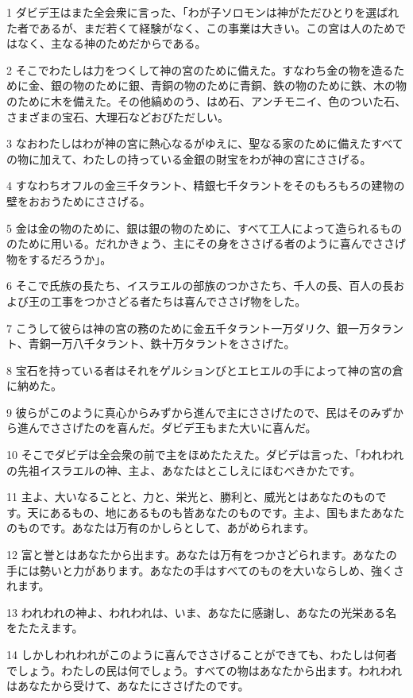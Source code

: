 \par 1 ダビデ王はまた全会衆に言った、「わが子ソロモンは神がただひとりを選ばれた者であるが、まだ若くて経験がなく、この事業は大きい。この宮は人のためではなく、主なる神のためだからである。
\par 2 そこでわたしは力をつくして神の宮のために備えた。すなわち金の物を造るために金、銀の物のために銀、青銅の物のために青銅、鉄の物のために鉄、木の物のために木を備えた。その他縞めのう、はめ石、アンチモニイ、色のついた石、さまざまの宝石、大理石などおびただしい。
\par 3 なおわたしはわが神の宮に熱心なるがゆえに、聖なる家のために備えたすべての物に加えて、わたしの持っている金銀の財宝をわが神の宮にささげる。
\par 4 すなわちオフルの金三千タラント、精銀七千タラントをそのもろもろの建物の壁をおおうためにささげる。
\par 5 金は金の物のために、銀は銀の物のために、すべて工人によって造られるもののために用いる。だれかきょう、主にその身をささげる者のように喜んでささげ物をするだろうか」。
\par 6 そこで氏族の長たち、イスラエルの部族のつかさたち、千人の長、百人の長および王の工事をつかさどる者たちは喜んでささげ物をした。
\par 7 こうして彼らは神の宮の務のために金五千タラント一万ダリク、銀一万タラント、青銅一万八千タラント、鉄十万タラントをささげた。
\par 8 宝石を持っている者はそれをゲルションびとエヒエルの手によって神の宮の倉に納めた。
\par 9 彼らがこのように真心からみずから進んで主にささげたので、民はそのみずから進んでささげたのを喜んだ。ダビデ王もまた大いに喜んだ。
\par 10 そこでダビデは全会衆の前で主をほめたたえた。ダビデは言った、「われわれの先祖イスラエルの神、主よ、あなたはとこしえにほむべきかたです。
\par 11 主よ、大いなることと、力と、栄光と、勝利と、威光とはあなたのものです。天にあるもの、地にあるものも皆あなたのものです。主よ、国もまたあなたのものです。あなたは万有のかしらとして、あがめられます。
\par 12 富と誉とはあなたから出ます。あなたは万有をつかさどられます。あなたの手には勢いと力があります。あなたの手はすべてのものを大いならしめ、強くされます。
\par 13 われわれの神よ、われわれは、いま、あなたに感謝し、あなたの光栄ある名をたたえます。
\par 14 しかしわれわれがこのように喜んでささげることができても、わたしは何者でしょう。わたしの民は何でしょう。すべての物はあなたから出ます。われわれはあなたから受けて、あなたにささげたのです。
